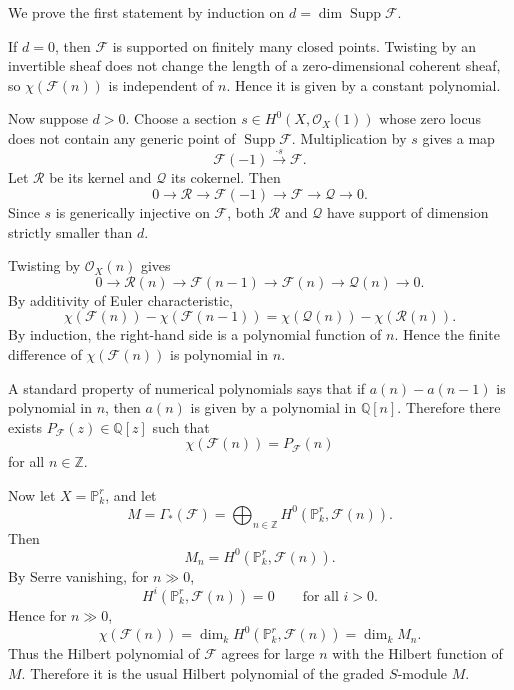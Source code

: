 \documentclass[12pt]{article}
\begin{document}
\begin{solution}
    We prove the first statement by induction on $d=\dim \operatorname{Supp}\mathcal F$.

    If $d=0$, then $\mathcal F$ is supported on finitely many closed points. Twisting by an invertible sheaf does not change the length of a zero-dimensional coherent sheaf, so $\chi(\mathcal F(n))$ is independent of $n$. Hence it is given by a constant polynomial.

    Now suppose $d>0$. Choose a section $s\in H^0(X,\mathcal O_X(1))$ whose zero locus does not contain any generic point of $\operatorname{Supp}\mathcal F$. Multiplication by $s$ gives a map
    \[
        \mathcal F(-1)\xrightarrow{\cdot s}\mathcal F.
    \]
    Let $\mathcal R$ be its kernel and $\mathcal Q$ its cokernel. Then
    \[
        0\to \mathcal R\to \mathcal F(-1)\to \mathcal F\to \mathcal Q\to 0.
    \]
    Since $s$ is generically injective on $\mathcal F$, both $\mathcal R$ and $\mathcal Q$ have support of dimension strictly smaller than $d$.

    Twisting by $\mathcal O_X(n)$ gives
    \[
        0\to \mathcal R(n)\to \mathcal F(n-1)\to \mathcal F(n)\to \mathcal Q(n)\to 0.
    \]
    By additivity of Euler characteristic,
    \[
        \chi(\mathcal F(n))-\chi(\mathcal F(n-1))
        =
        \chi(\mathcal Q(n))-\chi(\mathcal R(n)).
    \]
    By induction, the right-hand side is a polynomial function of $n$. Hence the finite difference of $\chi(\mathcal F(n))$ is polynomial in $n$.

    A standard property of numerical polynomials says that if $a(n)-a(n-1)$ is polynomial in $n$, then $a(n)$ is given by a polynomial in $\mathbb Q[n]$. Therefore there exists $P_{\mathcal F}(z)\in \mathbb Q[z]$ such that
    \[
        \chi(\mathcal F(n))=P_{\mathcal F}(n)
    \]
    for all $n\in \mathbb Z$.

    Now let $X=\mathbb P^r_k$, and let
    \[
        M=\Gamma_*(\mathcal F)=\bigoplus_{n\in \mathbb Z}H^0(\mathbb P^r_k,\mathcal F(n)).
    \]
    Then
    \[
        M_n=H^0(\mathbb P^r_k,\mathcal F(n)).
    \]
    By Serre vanishing, for $n\gg 0$,
    \[
        H^i(\mathbb P^r_k,\mathcal F(n))=0
        \qquad
        \text{for all } i>0.
    \]
    Hence for $n\gg 0$,
    \[
        \chi(\mathcal F(n))
        =
        \dim_k H^0(\mathbb P^r_k,\mathcal F(n))
        =
        \dim_k M_n.
    \]
    Thus the Hilbert polynomial of $\mathcal F$ agrees for large $n$ with the Hilbert function of $M$. Therefore it is the usual Hilbert polynomial of the graded $S$-module $M$.
\end{solution}
\end{document}
